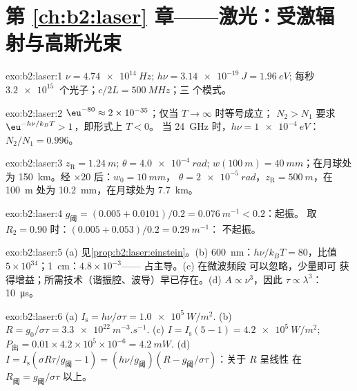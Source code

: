 \section*{第 \ref{ch:b2:laser} 章——激光：受激辐射与高斯光束}

\begin{solution}{exo:b2:laser:1}
$\nu = \qty{4.74e14}{Hz}$; $h\nu = \qty{3.14e-19}{J} = \qty{1.96}{eV}$;
每秒 $\qty{3.2e15}{}$ 个光子；$c/2L = \qty{500}{MHz}$；三
个模式。
\end{solution}

\begin{solution}{exo:b2:laser:2}
$\eu^{-80} \approx 2 \times 10^{-35}$；仅当 $T \to \infty$ 时等号成立；
$N_2 > N_1$ 要求 $\eu^{-h\nu/k_BT} > 1$，即形式上 $T < 0$。
当 \qty{24}{GHz} 时，$h\nu = \qty{1e-4}{eV}$：$N_2/N_1 = 0.996$。
\end{solution}

\begin{solution}{exo:b2:laser:3}
$z_{\text{R}} = \qty{1.24}{m}$; $\theta = \qty{4.0e-4}{rad}$; $w(\qty{100}{m}) =
\qty{40}{mm}$；在月球处为 \qty{150}{km}。经 $\times 20$ 后：$w_0 = \qty{10}{mm}$，
$\theta = \qty{2e-5}{rad}$，$z_{\text{R}} = \qty{500}{m}$，在
\qty{100}{m} 处为 \qty{10.2}{mm}，在月球处为 \qty{7.7}{km}。
\end{solution}

\begin{solution}{exo:b2:laser:4}
$g_{\text{阈}} = (0.005 + 0.0101)/0.2 = \qty{0.076}{m^{-1}} < 0.2$：起振。
取 $R_2 = 0.90$ 时：$(0.005 + 0.053)/0.2 = \qty{0.29}{m^{-1}}$：
不起振。
\end{solution}

\begin{solution}{exo:b2:laser:5}
(a) 见\cref{prop:b2:laser:einstein}。(b) \qty{600}{nm}：$h\nu/k_BT
= 80$，比值 $5 \times 10^{34}$；\qty{1}{cm}：$4.8 \times 10^{-3}$——
占主导。(c) 在微波频段
可以忽略，少量即可
获得增益；所需技术（谐振腔、波导）早已存在。(d) $A \propto
\nu^3$，因此 $\tau \propto \lambda^3$：\qty{10}{\micro s}。
\end{solution}

\begin{solution}{exo:b2:laser:6}
(a) $I_{\text{s}} = h\nu/\sigma\tau = \qty{1.0e5}{W/m^2}$. (b) $R =
g_0/\sigma\tau = \qty{3.3e22}{m^{-3}.s^{-1}}$. (c) $I = I_{\text{s}}(5 - 1) =
\qty{4.2e5}{W/m^2}$; $P_{\text{出}} = 0.01 \times 4.2 \times 10^5 \times
10^{-6} = \qty{4.2}{mW}$. (d) $I = I_{\text{s}}(\sigma R\tau/g_{\text{阈}}
- 1) = (h\nu/g_{\text{阈}})(R - g_{\text{阈}}/\sigma\tau)$：关于 $R$ 呈线性
在 $R_{\text{阈}} = g_{\text{阈}}/\sigma\tau$ 以上。
\end{solution}

